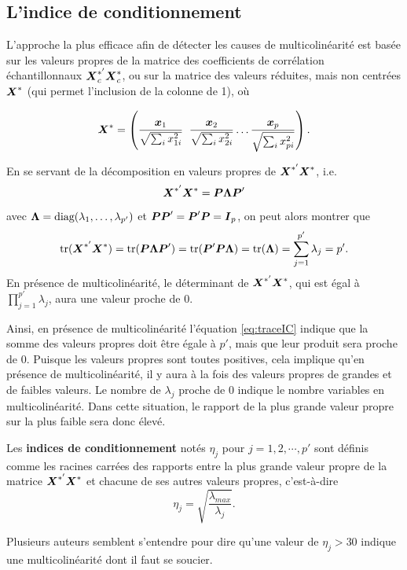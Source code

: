 \subsection{L'indice de conditionnement}

\label{sec:FacteurDeConditionnement}
L'approche la plus efficace afin de détecter les causes de multicolinéarité est basée sur les valeurs propres de la matrice des coefficients de corrélation échantillonnaux $\mbox{\boldmath$X$\unboldmath}_c^{*'}\mbox{\boldmath$X$\unboldmath}_c^*$, ou sur la matrice des valeurs réduites, mais non centrées $\mbox{\boldmath$X$\unboldmath}^*$ (qui permet l'inclusion de la colonne de 1), où 

$$\mbox{\boldmath$X$\unboldmath}^*=\left(\frac{\mbox{\boldmath$x$\unboldmath}_1}{\sqrt{\sum_i x_{1i}^2} }\;\;\frac{\mbox{\boldmath$x$\unboldmath}_2}{\sqrt{\sum_i x_{2i}^2}} \ldots \frac{\mbox{\boldmath$x$\unboldmath}_p}{\sqrt{\sum_i x_{pi}^2}}  \right).$$

En se servant de la décomposition en valeurs propres de $\mbox{\boldmath$X$\unboldmath}^{*'}\mbox{\boldmath$X$\unboldmath}^*$, i.e.
$$\mbox{\boldmath$X$\unboldmath}^{*'}\mbox{\boldmath$X$\unboldmath}^*=\mbox{\boldmath$P$\unboldmath}\mbox{\boldmath$\Lambda$\unboldmath} \mbox{\boldmath$P$\unboldmath}'$$
avec $\mbox{\boldmath$\Lambda$\unboldmath}=\text{diag}(\lambda_1,\ldots,\lambda_{p'})$ et $\mbox{\boldmath$P$\unboldmath}\mbox{\boldmath$P$\unboldmath}'= \mbox{\boldmath$P$\unboldmath}'\mbox{\boldmath$P$\unboldmath}=\mbox{\boldmath$I$\unboldmath}_p$, on peut alors montrer que
\begin{equation}
\text{tr}(\mbox{\boldmath$X$\unboldmath}^{*'}\mbox{\boldmath$X$\unboldmath}^*)=\text{tr}(\mbox{\boldmath$P$\unboldmath}\mbox{\boldmath$\Lambda$\unboldmath} \mbox{\boldmath$P$\unboldmath}')=\mbox{tr}(\mbox{\boldmath$P$\unboldmath}'\mbox{\boldmath$P$\unboldmath}\mbox{\boldmath$\Lambda$\unboldmath})=\mbox{tr}(\mbox{\boldmath$\Lambda$\unboldmath})=\sum_{j=1}^{p'}\lambda_j=p'.
\label{eq:traceIC}
\end{equation}
En présence de multicolinéarité, le déterminant de $\mbox{\boldmath$X$\unboldmath}^{*'}\mbox{\boldmath$X$\unboldmath}^*$, qui est égal à $\prod\limits_{j=1}^{p'}\lambda_j$, aura une valeur proche de 0.



Ainsi, en présence de multicolinéarité l'équation \ref{eq:traceIC} indique que la somme des valeurs propres doit être égale à $p'$, mais que leur produit sera proche de 0. Puisque les valeurs propres sont toutes positives, cela implique qu'en présence de multicolinéarité, il y aura \`a la fois des valeurs propres de grandes et de faibles valeurs. Le nombre de $\lambda_j$ proche de 0 indique le nombre variables en multicolinéarité. Dans cette situation, le rapport de la plus grande valeur propre sur la plus faible sera donc élevé.

Les \textbf{indices de conditionnement} notés $\eta_j$ pour ${j=1,2,\cdots,p'}$ sont définis comme les racines carrées des rapports entre la plus grande valeur propre de la matrice $\mbox{\boldmath$X$\unboldmath}^{*'}\mbox{\boldmath$X$\unboldmath}^*$ et chacune de ses autres valeurs propres, c'est-à-dire
$$\eta_j=\sqrt{\frac{\lambda_{max}}{\lambda_j}}.$$

Plusieurs auteurs semblent s'entendre pour dire qu'une valeur de $\eta_j > 30$ indique une multicolinéarité dont il faut se
soucier.

